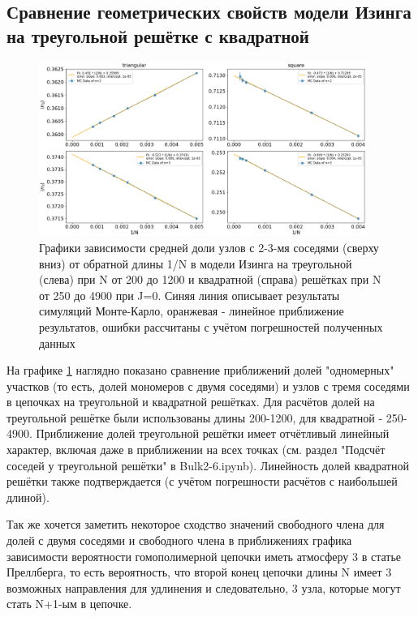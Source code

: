 \newpage

\subsection{Сравнение геометрических свойств модели Изинга на треугольной решётке с квадратной}

\begin{figure}
    \centering
    \includegraphics[width=0.95\textwidth]{Sections/Images/triagle_vs_square_bulk.png}
    \caption{Графики зависимости средней доли узлов с 2-3-мя соседями (сверху вниз) от обратной длины 1/N в модели Изинга на треугольной (слева) при N от 200 до 1200 и квадратной (справа) решётках при N от 250 до 4900 при J=0. Синяя линия описывает результаты симуляций Монте-Карло, оранжевая - линейное приближение результатов, ошибки рассчитаны с учётом погрешностей полученных данных}
    \label{fig:tr_vs_sq_bulk}
\end{figure}

На графике \ref{fig:tr_vs_sq_bulk} наглядно показано сравнение приближений долей "одномерных" участков (то есть, долей мономеров с двумя соседями) и узлов с тремя соседями в цепочках на треугольной и квадратной решётках. Для расчётов долей на треугольной решётке были использованы длины 200-1200, для квадратной - 250-4900. Приближение долей треугольной решётки имеет отчётливый линейный характер, включая даже в приближении на всех точках (см. раздел "Подсчёт соседей у треугольной решётки" в Bulk2-6.ipynb\cite{Git}). Линейность долей квадратной решётки также подтверждается (с учётом погрешности расчётов с наибольшей длиной).

Так же хочется заметить некоторое сходство значений свободного члена для долей с двумя соседями и свободного члена в приближениях графика зависимости вероятности гомополимерной цепочки иметь атмосферу 3 в статье Преллберга\cite{Prellberg}, то есть вероятность, что второй конец цепочки длины N имеет 3 возможных направления для удлинения и следовательно, 3 узла, которые могут стать N+1-ым в цепочке.

